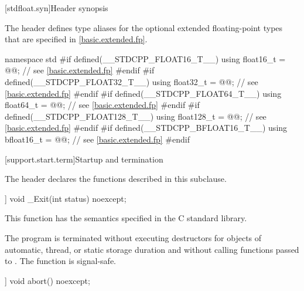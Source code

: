 [stdfloat.syn]{Header  synopsis}

\pnum
The header  defines type aliases for
the optional extended floating-point types that are specified in
\ref{basic.extended.fp}.

%
%
%
%
%
%
\begin{codeblock}
namespace std {
  #if defined(__STDCPP_FLOAT16_T__)
    using float16_t  = @@;  // see \ref{basic.extended.fp}
  #endif
  #if defined(__STDCPP_FLOAT32_T__)
    using float32_t  = @@;  // see \ref{basic.extended.fp}
  #endif
  #if defined(__STDCPP_FLOAT64_T__)
    using float64_t  = @@;  // see \ref{basic.extended.fp}
  #endif
  #if defined(__STDCPP_FLOAT128_T__)
    using float128_t = @@; // see \ref{basic.extended.fp}
  #endif
  #if defined(__STDCPP_BFLOAT16_T__)
    using bfloat16_t = @@; // see \ref{basic.extended.fp}
  #endif
}
\end{codeblock}

[support.start.term]{Startup and termination}

\pnum
\begin{note}
The header 
declares the functions described in this subclause.
\end{note}

%
\begin{itemdecl}
[[noreturn]] void _Exit(int status) noexcept;
\end{itemdecl}

\begin{itemdescr}
\pnum
\effects
This function has the semantics specified in the C standard library.

\pnum
\remarks
The program is terminated without executing destructors for objects of automatic,
thread, or static storage duration and without calling functions passed to
.
%
The function  is signal-safe.
\end{itemdescr}

%
\begin{itemdecl}
[[noreturn]] void abort() noexcept;
\end{itemdecl}

